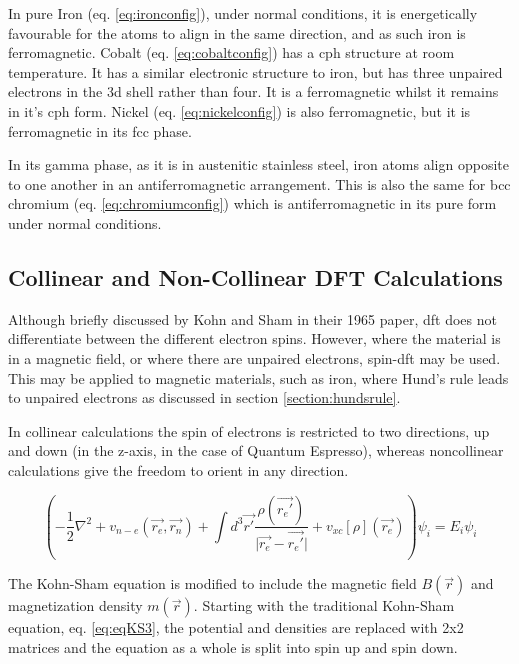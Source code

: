 In pure Iron (eq. \ref{eq:ironconfig}), under normal conditions, it is energetically favourable for the atoms to align in the same direction, and as such iron is ferromagnetic.  Cobalt (eq. \ref{eq:cobaltconfig}) has a \acrlong{cph} structure at room temperature.  It has a similar electronic structure to iron, but has three unpaired electrons in the 3d shell rather than four.  It is a ferromagnetic whilst it remains in it's \acrshort{cph} form.  Nickel (eq. \ref{eq:nickelconfig}) is also ferromagnetic, but it is ferromagnetic in its \acrshort{fcc} phase.

In its gamma phase, as it is in austenitic stainless steel, iron atoms align opposite to one another in an antiferromagnetic arrangement.  This is also the same for \acrshort{bcc} chromium (eq. \ref{eq:chromiumconfig})  which is antiferromagnetic in its pure form under normal conditions.

 





\subsection{Collinear and Non-Collinear DFT Calculations}

Although briefly discussed by Kohn and Sham in their 1965 paper\cite{kohnsham}, \acrshort{dft} does not differentiate between the different electron spins.  However, where the material is in a magnetic field, or where there are unpaired electrons, spin-\acrshort{dft} may be used.  This may be applied to magnetic materials, such as iron, where Hund's rule leads to unpaired electrons as discussed in section \ref{section:hundsrule}.  

In collinear calculations the spin of electrons is restricted to two directions, up and down (in the z-axis, in the case of Quantum Espresso), whereas noncollinear calculations give the freedom to orient in any direction. 

\begin{equation}
\left( -\frac{1}{2} \nabla^2 + v_{n-e}(\vec{r_e}, \vec{r_n}) + \int d^3\vec{r'} \frac{\rho(\vec{r_{e}'})}{\lvert \vec{r_{e}} - \vec{r_{e}'} \rvert } + v_{xc}[\rho](\vec{r_{e}}) \right) \psi_{i} = E_{i} \psi_{i}
\label{eq:eqKS3}
\end{equation}

The Kohn-Sham equation is modified to include the magnetic field $B(\vec{r})$ and magnetization density $m(\vec{r})$\cite{spindft1}\cite{spindft2}.  Starting with the traditional Kohn-Sham equation, eq. \ref{eq:eqKS3}, the potential and densities are replaced with 2x2 matrices and the equation as a whole is split into spin up and spin down.

